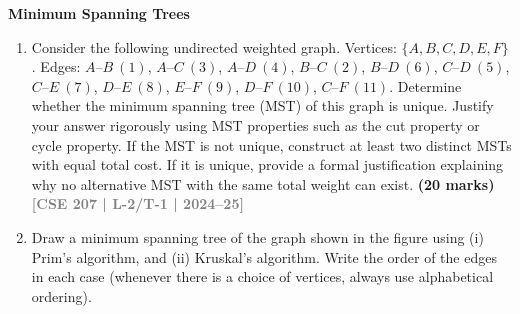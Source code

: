 \documentclass[12pt,a3paper]{article}
\newcommand{\yr}[1]{\hfill\textcolor{gray}{\small\textbf{[#1]}}}
\newcommand{\mk}[1]{\textcolor{orange!70!black}{\small\textbf{(#1 marks)}}}
\newcommand{\subtopic}[2]{%
  \vspace{10pt}
  \noindent\begin{tcolorbox}[colback=#1!8,colframe=#1,boxrule=0.6pt,arc=4pt,
    left=6pt,right=6pt,top=4pt,bottom=4pt]
    \small\bfseries\textcolor{#1}{#2}
  \end{tcolorbox}
  \vspace{2pt}
}
\begin{document}
\subtopic{cA}{Minimum Spanning Trees}
\label{sub:s1-mst}

\begin{enumerate}

\item Consider the following undirected weighted graph. Vertices: $\{A, B, C, D, E, F\}$. Edges: $A$--$B\ (1)$, $A$--$C\ (3)$, $A$--$D\ (4)$, $B$--$C\ (2)$, $B$--$D\ (6)$, $C$--$D\ (5)$, $C$--$E\ (7)$, $D$--$E\ (8)$, $E$--$F\ (9)$, $D$--$F\ (10)$, $C$--$F\ (11)$. Determine whether the minimum spanning tree (MST) of this graph is unique. Justify your answer rigorously using MST properties such as the cut property or cycle property. If the MST is not unique, construct at least two distinct MSTs with equal total cost. If it is unique, provide a formal justification explaining why no alternative MST with the same total weight can exist.
\mk{20} \yr{CSE 207 | L-2/T-1 | 2024--25}

\item Draw a minimum spanning tree of the graph shown in the figure using (i) Prim's algorithm, and (ii) Kruskal's algorithm. Write the order of the edges in each case (whenever there is a choice of vertices, always use alphabetical ordering).
\begin{center}
\end{center}
\end{enumerate}
\end{document}
